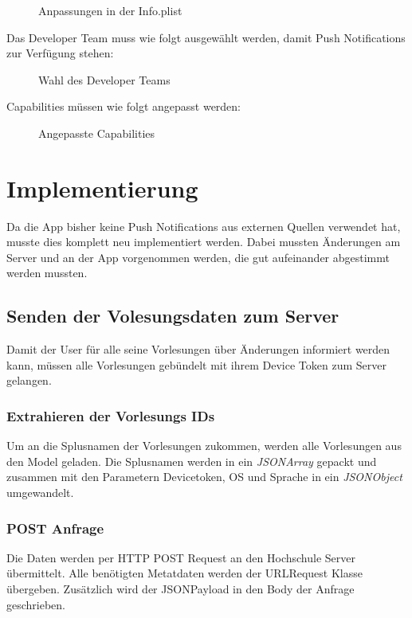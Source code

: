 \begin{figure}[H]
	\centering
	\caption{Anpassungen in der Info.plist}
	\label{plist}
\end{figure}


Das Developer Team muss wie folgt ausgewählt werden, damit Push Notifications zur Verfügung stehen:
\begin{figure}[H]
	\centering
	\caption{Wahl des Developer Teams}
	\label{devteam}
\end{figure}


Capabilities müssen wie folgt angepasst werden:

\begin{figure}[H]
	\centering
	\caption{Angepasste Capabilities}
	\label{capabilities}
\end{figure}

\newpage

\section{Implementierung}
Da die App bisher keine Push Notifications aus externen Quellen verwendet hat, musste dies komplett neu implementiert werden. Dabei mussten Änderungen am Server und  an der App vorgenommen werden, die gut aufeinander abgestimmt werden mussten.

\subsection{Senden der Volesungsdaten zum Server}
Damit der User für alle seine Vorlesungen über Änderungen informiert werden kann, müssen alle Vorlesungen gebündelt mit ihrem Device Token zum Server gelangen. 

\subsubsection{Extrahieren der Vorlesungs IDs}
Um an die Splusnamen der Vorlesungen zukommen, werden alle Vorlesungen aus den Model geladen. Die Splusnamen werden in ein \textit{JSONArray} gepackt und zusammen mit den Parametern Devicetoken, OS und Sprache in ein \textit{JSONObject} umgewandelt.


\newpage

\subsubsection{POST Anfrage}
Die Daten werden per HTTP POST Request an den Hochschule Server übermittelt. Alle benötigten Metatdaten werden der URLRequest Klasse übergeben. Zusätzlich wird der JSONPayload in den Body der Anfrage geschrieben. 


